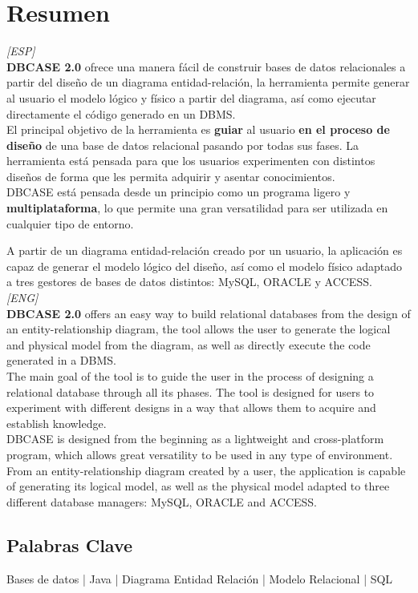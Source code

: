\chapter*{Resumen}%
\textit{[ESP]}\\

\textbf{DBCASE 2.0} ofrece una manera fácil de construir bases de datos relacionales a partir del diseño de un diagrama entidad-relación, la herramienta permite generar al usuario el modelo lógico y físico a partir del diagrama, así como ejecutar directamente el código generado en un DBMS.\\

El principal objetivo de la herramienta es \textbf{guiar} al usuario \textbf{en el proceso de diseño} de una base de datos relacional pasando por todas sus fases. La herramienta está pensada para que los usuarios experimenten con distintos diseños de forma que les permita adquirir y asentar conocimientos.\\

DBCASE está pensada desde un principio como un programa ligero y \textbf{multiplataforma}, lo que permite una gran versatilidad para ser utilizada en cualquier tipo de entorno.

A partir de un diagrama entidad-relación creado por un usuario, la aplicación es capaz de generar el modelo lógico del diseño, así como el modelo físico adaptado a tres gestores de bases de datos distintos: MySQL, ORACLE y ACCESS.\\

\textit{[ENG]}\\

\textbf{DBCASE 2.0} offers an easy way to build relational databases from the design of an entity-relationship diagram, the tool allows the user to generate the logical and physical model from the diagram, as well as directly execute the code generated in a DBMS.\\

The main goal of the tool is to guide the user in the process of designing a relational database through all its phases. The tool is designed for users to experiment with different designs in a way that allows them to acquire and establish knowledge.\\

DBCASE is designed from the beginning as a lightweight and cross-platform program, which allows great versatility to be used in any type of environment.\\

From an entity-relationship diagram created by a user, the application is capable of generating its logical model, as well as the physical model adapted to three different database managers: MySQL, ORACLE and ACCESS.
\section*{Palabras Clave}
Bases de datos | Java | Diagrama Entidad Relación | Modelo Relacional | SQL
